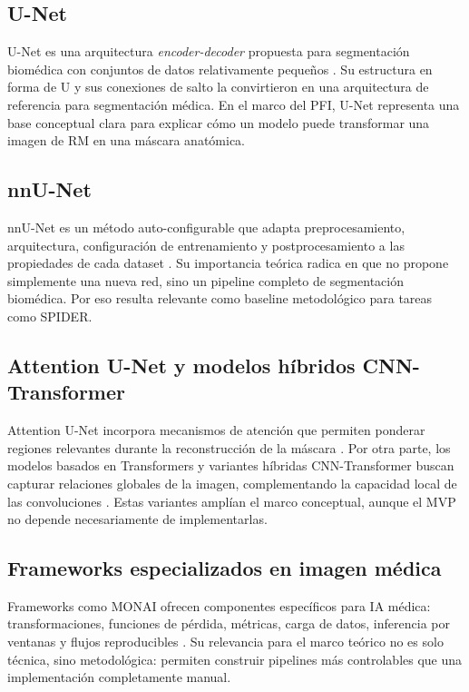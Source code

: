 \subsection{U-Net}

U-Net es una arquitectura \textit{encoder-decoder} propuesta para segmentación biomédica con conjuntos de datos relativamente pequeños \parencite{ronneberger_unet_2015}. Su estructura en forma de U y sus conexiones de salto la convirtieron en una arquitectura de referencia para segmentación médica. En el marco del PFI, U-Net representa una base conceptual clara para explicar cómo un modelo puede transformar una imagen de RM en una máscara anatómica.

\subsection{nnU-Net}

nnU-Net es un método auto-configurable que adapta preprocesamiento, arquitectura, configuración de entrenamiento y postprocesamiento a las propiedades de cada dataset \parencite{isensee_nnunet_2021}. Su importancia teórica radica en que no propone simplemente una nueva red, sino un pipeline completo de segmentación biomédica. Por eso resulta relevante como baseline metodológico para tareas como SPIDER.

\subsection{Attention U-Net y modelos híbridos CNN-Transformer}

Attention U-Net incorpora mecanismos de atención que permiten ponderar regiones relevantes durante la reconstrucción de la máscara \parencite{oktay_attention_unet_2018}. Por otra parte, los modelos basados en Transformers y variantes híbridas CNN-Transformer buscan capturar relaciones globales de la imagen, complementando la capacidad local de las convoluciones \parencite{dosovitskiy_vit_2021}. Estas variantes amplían el marco conceptual, aunque el MVP no depende necesariamente de implementarlas.

\subsection{Frameworks especializados en imagen médica}

Frameworks como MONAI ofrecen componentes específicos para IA médica: transformaciones, funciones de pérdida, métricas, carga de datos, inferencia por ventanas y flujos reproducibles \parencite{monai_software}. Su relevancia para el marco teórico no es solo técnica, sino metodológica: permiten construir pipelines más controlables que una implementación completamente manual.

